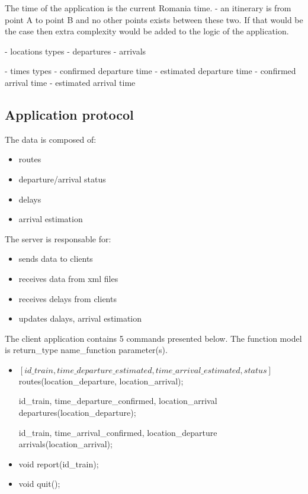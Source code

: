 \documentclass[runningheads]{llncs}
\begin{document}
The time of the application is the current Romania time.
- an itinerary is from point A to point B and no other points exists between these two. If that would be the case then extra complexity would be added to the logic of the application.

- locations types
    - departures
    - arrivals

- times types
    - confirmed departure time
    - estimated departure time
    - confirmed arrival time
    - estimated arrival time


\subsection{Application protocol}

The data is composed of:
\begin{itemize}
    \item routes
    \item departure/arrival status
    \item delays
    \item arrival estimation
\end{itemize}

The server is responsable for:
\begin{itemize}
    \item sends data to clients
    \item receives data from xml files
    \item receives delays from clients
    \item updates dalays, arrival estimation

\end{itemize}
    
The client application contains 5 commands presented below. The function model is return\_type name\_function parameter(s).

\begin{itemize}
    \item $[id\_train, time\_departure\_estimated, time\_arrival\_estimated, status]$ routes(location\_departure, location\_arrival);
    \item [id\_train, time\_departure\_confirmed, location\_arrival] departures(location\_departure);
    \item [id\_train, time\_arrival\_confirmed, location\_departure] arrivals(location\_arrival);
    \item void report(id\_train);
    \item void quit();
\end{itemize}
\end{document}
